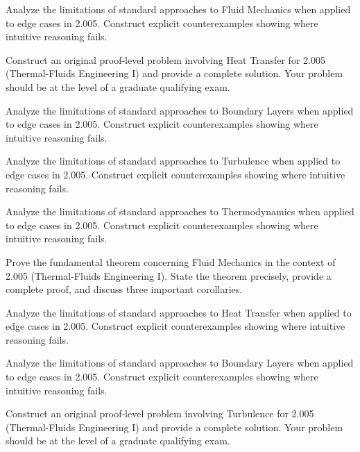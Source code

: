 \documentclass[12pt,a4paper]{exam}
\begin{document}
\begin{questions}
\vspace{0.3cm}

\question[3]
Analyze the limitations of standard approaches to Fluid Mechanics when applied to edge cases in 2.005. Construct explicit counterexamples showing where intuitive reasoning fails.

\vspace{0.3cm}

\question[3]
Construct an original proof-level problem involving Heat Transfer for 2.005 (Thermal-Fluids Engineering I) and provide a complete solution. Your problem should be at the level of a graduate qualifying exam.

\vspace{0.3cm}

\question[3]
Analyze the limitations of standard approaches to Boundary Layers when applied to edge cases in 2.005. Construct explicit counterexamples showing where intuitive reasoning fails.

\vspace{0.3cm}

\question[5]
Analyze the limitations of standard approaches to Turbulence when applied to edge cases in 2.005. Construct explicit counterexamples showing where intuitive reasoning fails.

\vspace{0.3cm}

\question[4]
Analyze the limitations of standard approaches to Thermodynamics when applied to edge cases in 2.005. Construct explicit counterexamples showing where intuitive reasoning fails.

\vspace{0.3cm}

\question[2]
Prove the fundamental theorem concerning Fluid Mechanics in the context of 2.005 (Thermal-Fluids Engineering I). State the theorem precisely, provide a complete proof, and discuss three important corollaries.

\vspace{0.3cm}

\question[5]
Analyze the limitations of standard approaches to Heat Transfer when applied to edge cases in 2.005. Construct explicit counterexamples showing where intuitive reasoning fails.

\vspace{0.3cm}

\question[4]
Analyze the limitations of standard approaches to Boundary Layers when applied to edge cases in 2.005. Construct explicit counterexamples showing where intuitive reasoning fails.

\vspace{0.3cm}

\question[3]
Construct an original proof-level problem involving Turbulence for 2.005 (Thermal-Fluids Engineering I) and provide a complete solution. Your problem should be at the level of a graduate qualifying exam.

\vspace{0.3cm}

\end{questions}
\end{document}
